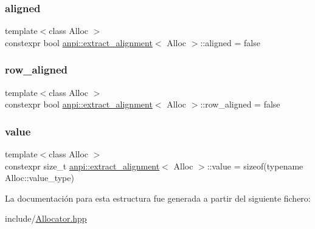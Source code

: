 \subsubsection{\texorpdfstring{aligned}{aligned}}
{\footnotesize\ttfamily template$<$class Alloc $>$ \\
constexpr bool \hyperlink{structanpi_1_1extract__alignment}{anpi\+::extract\+\_\+alignment}$<$ Alloc $>$\+::aligned = false\hspace{0.3cm}{\ttfamily [static]}}

\mbox{\label{structanpi_1_1extract__alignment_a4e7985310e7f1be7c2277e665bb62a13}} 
\subsubsection{\texorpdfstring{row\+\_\+aligned}{row\_aligned}}
{\footnotesize\ttfamily template$<$class Alloc $>$ \\
constexpr bool \hyperlink{structanpi_1_1extract__alignment}{anpi\+::extract\+\_\+alignment}$<$ Alloc $>$\+::row\+\_\+aligned = false\hspace{0.3cm}{\ttfamily [static]}}

\mbox{\label{structanpi_1_1extract__alignment_aba8462924cf727c3c7df27fa3f32e41f}} 
\subsubsection{\texorpdfstring{value}{value}}
{\footnotesize\ttfamily template$<$class Alloc $>$ \\
constexpr size\+\_\+t \hyperlink{structanpi_1_1extract__alignment}{anpi\+::extract\+\_\+alignment}$<$ Alloc $>$\+::value = sizeof(typename Alloc\+::value\+\_\+type)\hspace{0.3cm}{\ttfamily [static]}}



La documentación para esta estructura fue generada a partir del siguiente fichero\+:\begin{DoxyCompactItemize}
\item 
include/\hyperlink{Allocator_8hpp}{Allocator.\+hpp}\end{DoxyCompactItemize}
